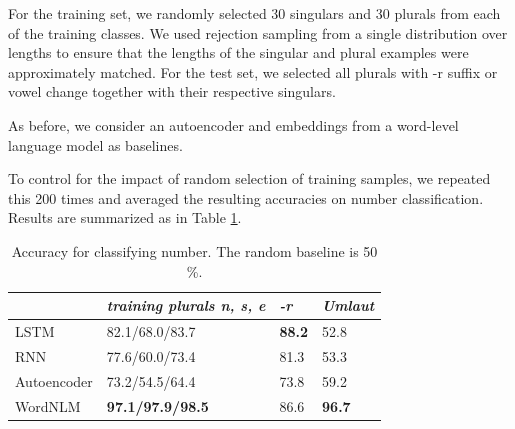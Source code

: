 For the training set, we randomly selected 30 singulars and 30 plurals from each of the training classes.
We used rejection sampling from a single distribution over lengths to ensure that the lengths of the singular and plural examples were approximately matched.
For the test set, we selected all plurals with -r suffix or vowel change together with their respective singulars.

As before, we consider an autoencoder and embeddings from a word-level language model as baselines.

To control for the impact of random selection of training samples, we repeated this 200 times and averaged the resulting accuracies on number classification.
Results are summarized as in Table \ref{tab:number-results}.


\begin{table}[t]
  \begin{center}
    \begin{tabular}{l|l|l|l}
      \multicolumn{1}{c}{}&\emph{training plurals n, s, e}&\emph{-r}&\emph{Umlaut}\\
      \hline
      LSTM& 82.1/68.0/83.7  & \textbf{88.2} & 52.8 \\
      RNN& 77.6/60.0/73.4 & 81.3 & 53.3\\
      Autoencoder& 73.2/54.5/64.4 & 73.8 & 59.2\\
      WordNLM& \textbf{97.1/97.9/98.5} & 86.6 & \textbf{96.7}  \\ %
    \end{tabular}
  \end{center}
  \caption{\label{tab:number-results} Accuracy for classifying number. The random baseline is 50 \%.}
\end{table}



